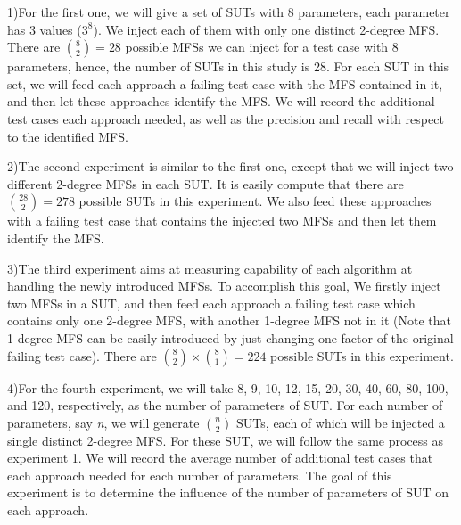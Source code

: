\documentclass{sig-alternate-05-2015}
\begin{document}
{{{{1)For the first one, we will give a set of SUTs with 8 parameters, each parameter has 3 values ($3^8$). We inject each of them with only one distinct 2-degree MFS. There are $\binom{8}{2} = 28$ possible MFSs we can inject for a test case with 8 parameters, hence, the number of SUTs in this study is 28. For each SUT in this set, we will feed each approach a failing test case with the MFS contained in it, and then let these approaches identify the MFS. We will record the additional test cases each approach needed, as well as the precision and recall with respect to the identified MFS.


2)The second experiment is similar to the first one, except that we will inject two different 2-degree MFSs in each SUT. It is easily compute that there are $\binom{28}{2} = 278$  possible SUTs in this experiment. We also feed these approaches with a failing test case that contains the injected two MFSs and then let them identify the MFS.

3)The third experiment aims at measuring capability of each algorithm at handling the  newly introduced MFSs. To accomplish this goal, We firstly inject two MFSs in a SUT, and then feed each approach a failing test case which contains only one 2-degree MFS, with another 1-degree MFS not in it (Note that 1-degree MFS can be easily introduced by just changing one factor of the original failing test case). There are $\binom{8}{2} \times \binom{8}{1} = 224$ possible SUTs in this experiment.


4)For the fourth experiment, we will take 8, 9, 10, 12, 15, 20, 30, 40, 60, 80, 100, and 120, respectively,  as the number of parameters of SUT. For each number of parameters, say \emph{n}, we will generate $\binom{n}{2}$ SUTs, each of which will be injected a single distinct 2-degree MFS. For these SUT, we will follow the same process as experiment 1. We will record the average number of additional test cases that each approach needed for each number of parameters. The goal of this experiment is to determine the influence of the number of parameters of SUT on each approach.

}}}}
\end{document}
